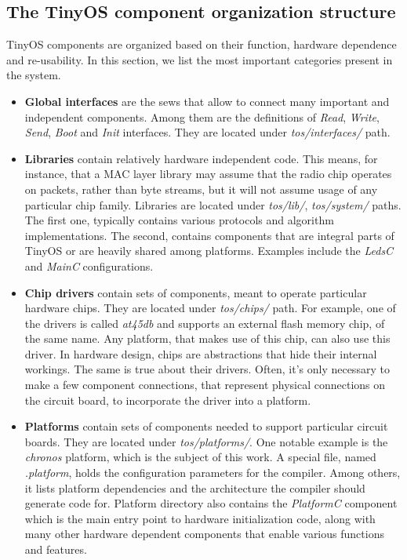 \subsection{The TinyOS component organization structure}

TinyOS components are organized based on their function, hardware
dependence and re-usability. In this section, we list the most
important categories present in the system.

\begin{itemize}
  \item {\bf Global interfaces} are the sews that allow to connect
    many important and independent components. Among them are the
    definitions of \emph{Read}, \emph{Write}, \emph{Send}, \emph{Boot}
    and \emph{Init} interfaces. They are located under
    \emph{tos/interfaces/} path.

  \item {\bf Libraries} contain relatively hardware independent code.
    This means, for instance, that a MAC layer library may assume that
    the radio chip operates on packets, rather than byte streams, but
    it will not assume usage of any particular chip family. Libraries
    are located under \emph{tos/lib/}, \emph{tos/system/} paths. The
    first one, typically contains various protocols and algorithm
    implementations. The second, contains components that are
    integral parts of TinyOS or are heavily shared among platforms.
    Examples include the \emph{LedsC} and \emph{MainC} configurations.

  \item {\bf Chip drivers} contain sets of components, meant to
    operate particular hardware chips. They are located under
    \emph{tos/chips/} path. For example, one of the drivers is called
    \emph{at45db} and supports an external flash memory chip, of the
    same name. Any platform, that makes use of this chip, can also use
    this driver. In hardware design, chips are abstractions that hide
    their internal workings. The same is true about their
    drivers. Often, it's only necessary to make a few component
    connections, that represent physical connections on the circuit
    board, to incorporate the driver into a platform.

  \item {\bf Platforms} contain sets of components needed to support
    particular circuit boards. They are located under
    \emph{tos/platforms/}. One notable example is the \emph{chronos}
    platform, which is the subject of this work. A special file, named
    \emph{.platform}, holds the configuration parameters for the
    compiler. Among others, it lists platform dependencies and the
    architecture the compiler should generate code for. Platform
    directory  also contains the \emph{PlatformC} component which is
    the main entry point to hardware initialization code, along with
    many other hardware dependent components that enable various
    functions and features.


\end{itemize}
